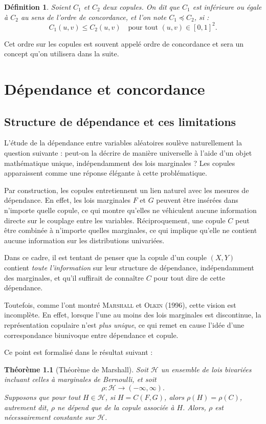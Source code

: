 \documentclass[a4paper,11pt]{amsbook}
\numberwithin{equation}{chapter}
\newtheorem{theoreme}			     {Théorème}	[chapter]
\newtheorem{definition}	[theoreme]   {Définition}
\theoremstyle{definition}
\begin{document}
\begin{definition}\label{def:order}
Soient \( C_1 \) et \( C_2 \) deux copules. On dit que \( C_1 \) est \emph{inférieure ou égale à \( C_2 \) au sens de l’ordre de concordance}, et l’on note \( C_1 \preceq C_2 \), si :
\[
C_1(u,v) \leq C_2(u,v) \quad \text{pour tout } (u,v) \in [0,1]^2.
\]
\end{definition}

Cet ordre sur les copules est souvent appelé ordre de concordance et sera un concept qu'on utilisera dans la suite.


\chapter{Dépendance et concordance}

\section{Structure de dépendance et ces limitations}
L'étude de la dépendance entre variables aléatoires soulève naturellement la question suivante : peut-on la décrire de manière universelle à l'aide d'un objet mathématique unique, indépendamment des lois marginales ? Les copules apparaissent comme une réponse élégante à cette problématique.

Par construction, les copules entretiennent un lien naturel avec les mesures de dépendance. En effet, les lois marginales \( F \) et \( G \) peuvent être insérées dans n’importe quelle copule, ce qui montre qu’elles ne véhiculent aucune information directe sur le couplage entre les variables. Réciproquement, une copule \( C \) peut être combinée à n’importe quelles marginales, ce qui implique qu’elle ne contient aucune information sur les distributions univariées.

Dans ce cadre, il est tentant de penser que la copule d’un couple \((X,Y)\) contient \emph{toute l'information} sur leur structure de dépendance, indépendamment des marginales, et qu’il suffirait de connaître \( C \) pour tout dire de cette dépendance.

Toutefois, comme l’ont montré \textsc{Marshall} et \textsc{Olkin} (1996), cette vision est incomplète. En effet, lorsque l’une au moins des lois marginales est discontinue, la représentation copulaire n’est \emph{plus unique}, ce qui remet en cause l’idée d’une correspondance biunivoque entre dépendance et copule.

Ce point est formalisé dans le résultat suivant : 
\begin{theoreme}[Théorème de Marshall]\label{thm:marshall}
Soit $\mathcal{H}$ un ensemble de lois bivariées incluant celles à marginales de Bernoulli, et soit 
\[
\rho : \mathcal{H} \to (-\infty, \infty).
\]
Supposons que pour tout \( H \in \mathcal{H} \), si \( H = C(F, G) \), alors \( \rho(H) = \rho(C) \), autrement dit, \( \rho \) ne dépend que de la copule associée à \( H \).  
Alors, \( \rho \) est nécessairement constante sur \( \mathcal{H} \).
\end{theoreme}
\end{document}
